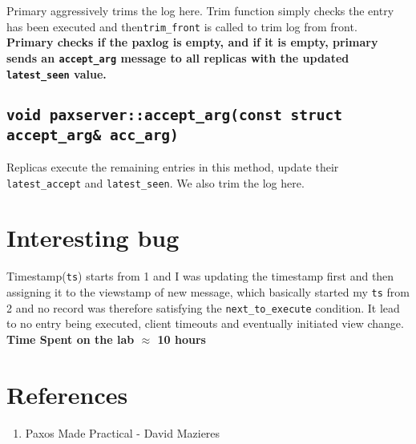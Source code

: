 \documentclass[10pt] {article}
\begin{document}
Primary aggressively trims the log here. Trim function simply checks the entry has been executed and then\texttt{trim\_front} is called to trim log from front. \\

\textbf{Primary checks if the paxlog is empty, and if it is empty, primary sends an \texttt{accept\_arg} message to all replicas with the updated \texttt{latest\_seen} value.}

\subsection {\texttt{void paxserver::accept\_arg(const struct accept\_arg\& acc\_arg)}}
Replicas execute the remaining entries in this method, update their \texttt{latest\_accept} and \texttt{latest\_seen}. We also trim the log here.

\section { Interesting bug}
Timestamp(\texttt{ts})  starts from 1 and I was updating the timestamp first and then assigning it to the viewstamp of new message, which basically started my \texttt{ts} from 2 and no record was therefore satisfying the \texttt{next\_to\_execute} condition. It lead to no entry being executed, client timeouts and eventually initiated view change. \\


\noindent \textbf{Time Spent on the lab \ensuremath{\approx} 10 hours} 

\section{References}
\begin{enumerate}
  \item Paxos Made Practical - David Mazieres
\end{enumerate}
\end{document}

